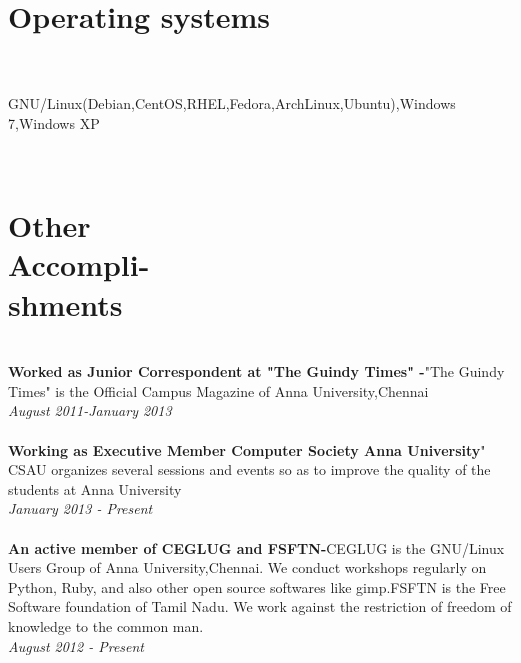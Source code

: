 \documentclass[margin,line]{resume}
\begin{document}
\begin{resume}
    \section{\mysidestyle Operating systems}\\ 
    \\ GNU/Linux(Debian,CentOS,RHEL,Fedora,ArchLinux,Ubuntu),Windows 7,Windows XP 


	 \\\section{\mysidestyle Other\\Accompli-\\shments}\\ 
    \textbf{Worked as Junior Correspondent at "The Guindy Times" -}"The Guindy Times" is the Official Campus Magazine of Anna University,Chennai
    \\\textsl{August 2011-January 2013}
    \\\\\textbf{Working as Executive Member Computer Society Anna University}" CSAU organizes several sessions and events so as to improve the quality of the students at Anna University
    \\\textsl{January 2013 - Present}
\\\\\textbf{An active member of CEGLUG and FSFTN-}CEGLUG is the GNU/Linux Users Group of Anna University,Chennai. We conduct workshops regularly on Python, Ruby, and also other open source softwares like gimp.FSFTN is the Free Software foundation of Tamil Nadu. We work against the restriction of freedom of knowledge to the common man. 
\\\textsl{August 2012 - Present}


\end{resume}
\end{document}
